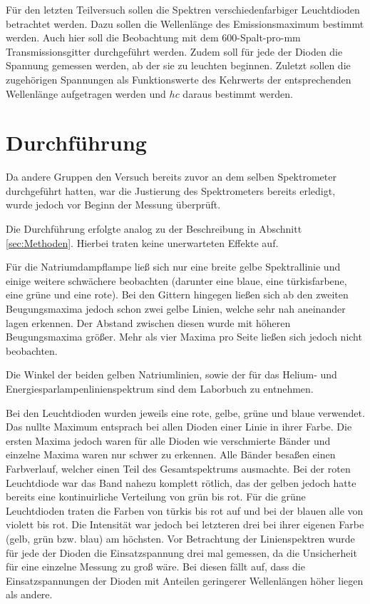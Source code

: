 	Für den letzten Teilversuch sollen die Spektren verschiedenfarbiger Leuchtdioden betrachtet werden.
	Dazu sollen die Wellenlänge des Emissionsmaximum bestimmt werden.
	Auch hier soll die Beobachtung mit dem 600-Spalt-pro-\si{\milli\meter} Transmissionsgitter durchgeführt werden.
	Zudem soll für jede der Dioden die Spannung gemessen werden, ab der sie zu leuchten beginnen.
	Zuletzt sollen die zugehörigen Spannungen als Funktionswerte des Kehrwerts der entsprechenden Wellenlänge aufgetragen werden und $hc$ daraus bestimmt werden.
	
\section{Durchführung}
		
	Da andere Gruppen den Versuch bereits zuvor an dem selben Spektrometer durchgeführt hatten, war die Justierung des Spektrometers bereits erledigt, wurde jedoch vor Beginn der Messung überprüft.
	
	Die Durchführung erfolgte analog zu der Beschreibung in Abschnitt \ref{sec:Methoden}.
	Hierbei traten keine unerwarteten Effekte auf.
	
	Für die Natriumdampflampe ließ sich nur eine breite gelbe Spektrallinie und einige weitere schwächere beobachten (darunter eine blaue, eine türkisfarbene, eine grüne und eine rote).
	Bei den Gittern hingegen ließen sich ab den zweiten Beugungsmaxima jedoch schon zwei gelbe Linien, welche sehr nah aneinander lagen erkennen.
	Der Abstand zwischen diesen wurde mit höheren Beugungsmaxima größer.
	Mehr als vier Maxima pro Seite ließen sich jedoch nicht beobachten.
	
	Die Winkel der beiden gelben Natriumlinien, sowie der für das Helium- und Energiesparlampenlinienspektrum sind dem Laborbuch zu entnehmen.
	
	Bei den Leuchtdioden wurden jeweils eine rote, gelbe, grüne und blaue verwendet.
	Das nullte Maximum entsprach bei allen Dioden einer Linie in ihrer Farbe.
	Die ersten Maxima jedoch waren für alle Dioden wie verschmierte Bänder und einzelne Maxima waren nur schwer zu erkennen.
	Alle Bänder besaßen einen Farbverlauf, welcher einen Teil des Gesamtspektrums ausmachte.
	Bei der roten Leuchtdiode war das Band nahezu komplett rötlich, das der gelben jedoch hatte bereits eine kontinuirliche Verteilung von grün bis rot.
	Für die grüne Leuchtdioden traten die Farben von türkis bis rot auf und bei der blauen alle von violett bis rot.
	Die Intensität war jedoch bei letzteren drei bei ihrer eigenen Farbe (gelb, grün bzw. blau) am höchsten.
	Vor Betrachtung der Linienspektren wurde für jede der Dioden die Einsatzspannung drei mal gemessen, da die Unsicherheit für eine einzelne Messung zu groß wäre.
	Bei diesen fällt auf, dass die Einsatzspannungen der Dioden mit Anteilen geringerer Wellenlängen höher liegen als andere.   
		

